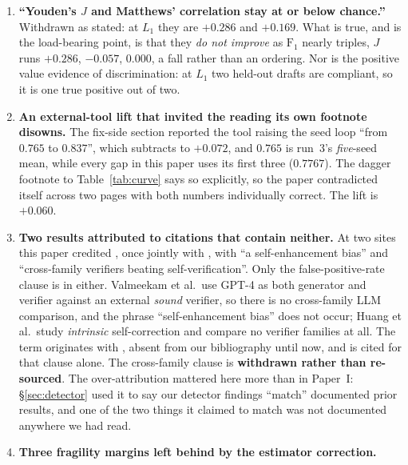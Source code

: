 \documentclass[11pt]{article}
\begin{document}
\begin{enumerate}
    Separately, ``three magnitudes shrink by $35$ to $52\%$'' was selectively true: a fourth
    magnitude falls to near nothing and a fifth \emph{grows} by $74\%$, so the sentence read as the
    shape of the whole correction when it described part of it. All restatements now agree, and a
    check compares every restatement of a statistic against the first.
  \item \textbf{``Youden's $J$ and Matthews' correlation stay at or below chance.''} Withdrawn as
    stated: at $L_1$ they are $+0.286$ and $+0.169$. What is true, and is the load-bearing point, is
    that they \emph{do not improve} as $\mathrm{F}_1$ nearly triples, $J$ runs $+0.286$, $-0.057$,
    $0.000$, a fall rather than an ordering. Nor is the positive value evidence of discrimination:
    at $L_1$ two held-out drafts are compliant, so it is one true positive out of two.
  \item \textbf{An external-tool lift that invited the reading its own footnote disowns.} The
    fix-side section reported the tool raising the seed loop ``from $0.765$ to $0.837$'', which
    subtracts to $+0.072$, and $0.765$ is run~3's \emph{five}-seed mean, while every gap in this
    paper uses its first three ($0.7767$). The dagger footnote to Table~\ref{tab:curve} says so
    explicitly, so the paper contradicted itself across two pages with both numbers individually
    correct. The lift is $+0.060$.
  \item \textbf{Two results attributed to citations that contain neither.} At two sites this paper
    credited \citet{valmeekam2023selfcritique}, once jointly with
    \citet{huang2023cannot}, with ``a self-enhancement bias'' and ``cross-family verifiers
    beating self-verification''. Only the false-positive-rate clause is in either. Valmeekam et
    al.\ use GPT-4 as both generator and verifier against an external \emph{sound} verifier, so
    there is no cross-family LLM comparison, and the phrase ``self-enhancement bias'' does not
    occur; Huang et al.\ study \emph{intrinsic} self-correction and compare no verifier families at
    all. The term originates with \citet{zheng2023judging}, absent from our bibliography until now,
    and is cited for that clause alone. The cross-family clause is \textbf{withdrawn rather than
    re-sourced}. The over-attribution mattered here more than in Paper~I: \S\ref{sec:detector} used
    it to say our detector findings ``match'' documented prior results, and one of the two things it
    claimed to match was not documented anywhere we had read.
  \item \textbf{Three fragility margins left behind by the estimator correction.}

\end{enumerate}
\end{document}
